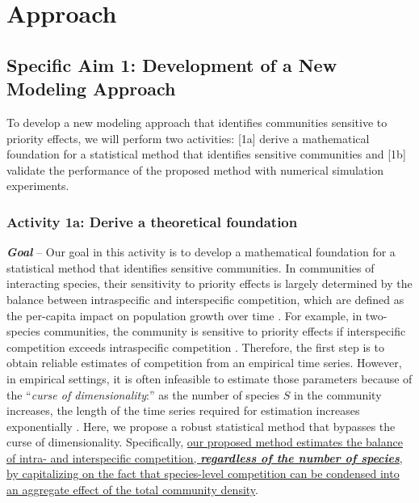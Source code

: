 \documentclass[12pt, class=article, crop=false]{standalone}
\begin{document}
\section{Approach}

\subsection*{Specific Aim 1: Development of a New Modeling Approach}

To develop a new modeling approach that identifies communities sensitive to priority effects, we will perform two activities:
[1a] derive a mathematical foundation for a statistical method that identifies sensitive communities and [1b] validate the performance of the proposed method with numerical simulation experiments.

\subsubsection*{Activity 1a: Derive a theoretical foundation}

\textbf{\textit{Goal}} -- 
Our goal in this activity is to develop a mathematical foundation for a statistical method that identifies sensitive communities.
In communities of interacting species, their sensitivity to priority effects is largely determined by the balance between intraspecific and interspecific competition, which are defined as the per-capita impact on population growth over time \citep{chesson_mechanisms_2000, barabas_chessons_2018, ke_coexistence_2018, terui_intentional_2023}.
For example, in two-species communities, the community is sensitive to priority effects if interspecific competition exceeds intraspecific competition \citep{ke_coexistence_2018}.
Therefore, the first step is to obtain reliable estimates of competition from an empirical time series.
However, in empirical settings, it is often infeasible to estimate those parameters because of the ``\textit{curse of dimensionality}:'' as the number of species $S$ in the community increases, the length of the time series required for estimation increases exponentially \citep{ovaskainen_how_2017}.
Here, we propose a robust statistical method that bypasses the curse of dimensionality. Specifically, \ul{our proposed method estimates the balance of intra- and interspecific competition, \textbf{\textit{regardless of the number of species}}, by capitalizing on the fact that species-level competition can be condensed into an aggregate effect of the total community density}.
\end{document}
